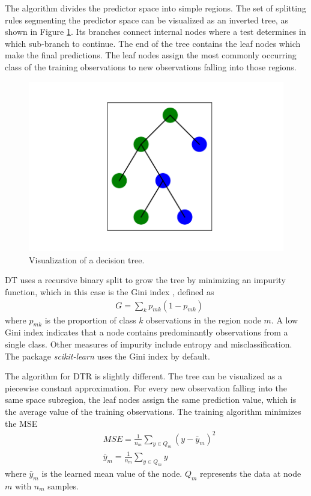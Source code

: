 
The algorithm divides the predictor space into simple regions.
The set of splitting rules segmenting the predictor space can be visualized as an inverted tree, as shown in Figure \ref{fig:dt}.
Its branches connect internal nodes where a test determines in which sub-branch to continue.
The end of the tree contains the leaf nodes which make the final predictions.
The leaf nodes assign the most commonly occurring class of the training observations to new observations falling into those regions.

\begin{figure}[htbp!] %
  \centering
  \includegraphics[width=0.5\linewidth]{figures/dt}
  \caption{Visualization of a decision tree.}
  \label{fig:dt}
\end{figure}

\Gls*{DT} uses a recursive binary split to grow the tree by minimizing an impurity function, which in this case is the Gini index \cite{pedregosa_scikit-learn_2011}, defined as
\begin{align}
& G = \sum_k p_{mk}(1-p_{mk}) \label{eq-dt}
\end{align}
where $p_{mk}$ is the proportion of class $k$ observations in the region node $m$.
A low Gini index indicates that a node contains predominantly observations from a single class.
Other measures of impurity include entropy and misclassification.
The package \textit{scikit-learn} uses the Gini index by default.


The algorithm for \gls*{DTR} is slightly different.
The tree can be visualized as a piecewise constant approximation.
For every new observation falling into the same space subregion, the leaf nodes assign the same prediction value, which is the average value of the training observations.
The training algorithm minimizes the \gls*{MSE} \cite{pedregosa_scikit-learn_2011}
\begin{align}
& MSE = \frac{1}{n_m} \sum_{y \in Q_m} \left( y - \bar{y}_m \right)^2 \label{eq-dtr} \\
& \bar{y}_m = \frac{1}{n_m} \sum_{y \in Q_m} y
\end{align}
where $\bar{y}_m$ is the learned mean value of the node.
$Q_m$ represents the data at node $m$ with $n_m$ samples.


